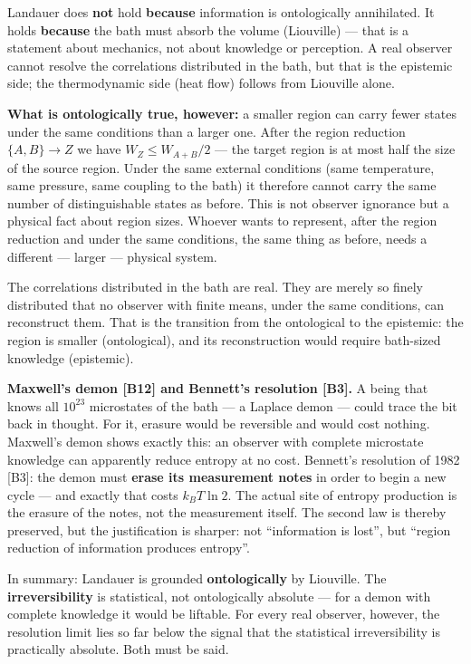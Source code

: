 Landauer does \textbf{not} hold \textbf{because} information is ontologically
annihilated. It holds \textbf{because} the bath must absorb the volume (Liouville)
--- that is a statement about mechanics, not about knowledge or perception. A real
observer cannot resolve the correlations distributed in the bath, but that is the
epistemic side; the thermodynamic side (heat flow) follows from Liouville alone.

\LB \textbf{What is ontologically true, however:} a smaller region can carry fewer
states under the same conditions than a larger one. After the region reduction
$\{A,B\} \to Z$ we have $W_Z \le W_{A+B}/2$ --- the target region is at most half
the size of the source region. Under the same external conditions (same
temperature, same pressure, same coupling to the bath) it therefore cannot carry
the same number of distinguishable states as before. This is not observer
ignorance but a physical fact about region sizes. Whoever wants to represent, after
the region reduction and under the same conditions, the same thing as before,
needs a different --- larger --- physical system.

The correlations distributed in the bath are real. They are merely so finely
distributed that no observer with finite means, under the same conditions, can
reconstruct them. That is the transition from the ontological to the epistemic:
the region is smaller (ontological), and its reconstruction would require
bath-sized knowledge (epistemic).

\LK \textbf{Maxwell's demon [B12] and Bennett's resolution [B3].} A being that
knows all $10^{23}$ microstates of the bath --- a Laplace demon --- could trace
the bit back in thought. For it, erasure would be reversible and would cost
nothing. Maxwell's demon shows exactly this: an observer with complete
microstate knowledge can apparently reduce entropy at no cost. Bennett's
resolution of 1982 [B3]: the demon must \textbf{erase its measurement notes} in
order to begin a new cycle --- and exactly that costs $k_B T \ln 2$. The actual
site of entropy production is the erasure of the notes, not the measurement
itself. The second law is thereby preserved, but the justification is sharper: not
“information is lost”, but “region reduction of information produces entropy”.

In summary: Landauer is grounded \textbf{ontologically} by Liouville. The
\textbf{irreversibility} is statistical, not ontologically absolute --- for a
demon with complete knowledge it would be liftable. For every real observer,
however, the resolution limit lies so far below the signal that the statistical
irreversibility is practically absolute. Both must be said.

